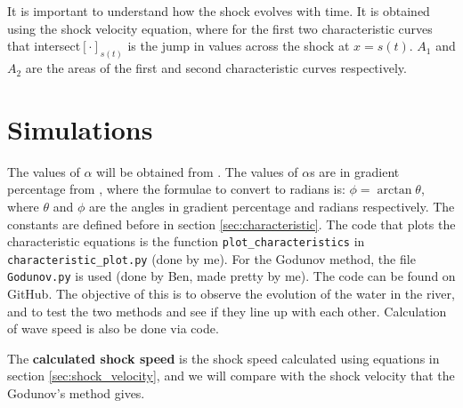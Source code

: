 \documentclass[12pt]{article}
\begin{document}
It is important to understand how the shock evolves with time. It is obtained using the shock velocity equation, where  for the first two characteristic curves that intersect$[\cdot]_{s(t)}$ is the jump in values across the shock at $x = s(t)$. $A_1$ and $A_2$ are the areas of the first and second characteristic curves respectively.

\section{Simulations}
\label{sec:results}
The values of $\alpha$ will be obtained from \cite{ROSGEN1994169}. The values of $\alpha$s are in gradient percentage from \cite{ROSGEN1994169}, where the formulae to convert to radians is: $\phi = \arctan{\theta}$, where $\theta$ and $\phi$ are the angles in gradient percentage and radians respectively. The constants are defined before in section \ref{sec:characteristic}. The code that plots the characteristic equations is the function \verb|plot_characteristics| in \verb|characteristic_plot.py| (done by me). For the Godunov method, the file \verb|Godunov.py| is used (done by Ben, made pretty by me). The code can be found on GitHub\cite{linsuong_2023}. The objective of this is to observe the evolution of the water in the river, and to test the two methods and see if they line up with each other. Calculation of wave speed is also be done via code.

The \textbf{calculated shock speed} is the shock speed calculated using equations in section \ref{sec:shock_velocity}, and we will compare with the shock velocity that the Godunov's method gives.
\end{document}
